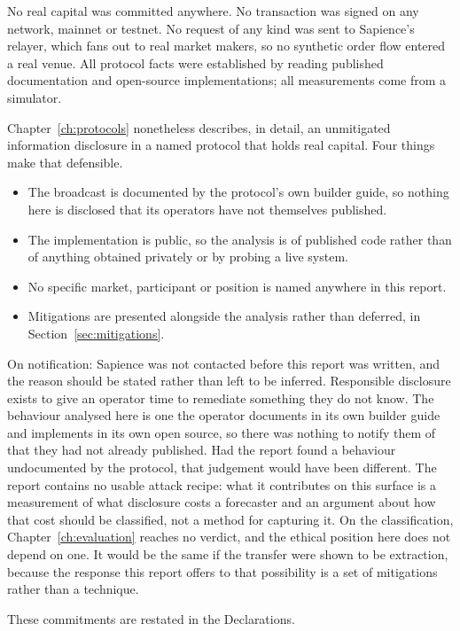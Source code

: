 No real capital was committed anywhere. No transaction was signed on any network, mainnet or
testnet. No request of any kind was sent to Sapience's relayer, which fans out to real market
makers, so no synthetic order flow entered a real venue. All protocol facts were established
by reading published documentation and open-source implementations; all measurements come
from a simulator.

Chapter~\ref{ch:protocols} nonetheless describes, in detail, an unmitigated information
disclosure in a named protocol that holds real capital. Four things make that defensible.

\begin{itemize}
  \item The broadcast is documented by the protocol's own builder guide, so nothing here is
    disclosed that its operators have not themselves published.
  \item The implementation is public, so the analysis is of published code rather than of
    anything obtained privately or by probing a live system.
  \item No specific market, participant or position is named anywhere in this report.
  \item Mitigations are presented alongside the analysis rather than deferred, in
    Section~\ref{sec:mitigations}.
\end{itemize}

On notification: Sapience was not contacted before this report was written, and the reason
should be stated rather than left to be inferred. Responsible disclosure exists to give an
operator time to remediate something they do not know. The behaviour analysed here is one
the operator documents in its own builder guide and implements in its own open source, so
there was nothing to notify them of that they had not already published. Had the report
found a behaviour undocumented by the protocol, that judgement would have been different. The report contains no usable attack recipe: what it
contributes on this surface is a measurement of what disclosure costs a forecaster and an
argument about how that cost should be classified, not a method for capturing it. On the
classification, Chapter~\ref{ch:evaluation} reaches no verdict, and the ethical position
here does not depend on one. It would be the same if the transfer were shown to be
extraction, because the response this report offers to that possibility is a set of
mitigations rather than a technique.

These commitments are restated in the Declarations.

